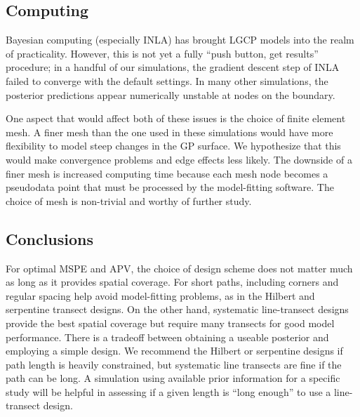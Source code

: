 \documentclass[review]{elsarticle}
\begin{document}


\subsection{Computing}

Bayesian computing (especially INLA) has brought LGCP models into the realm of
practicality. However, this is not yet a fully ``push button, get results''
procedure; in a handful of our simulations, the gradient descent step of INLA
failed to converge with the default settings. In many other simulations, the
posterior predictions appear numerically unstable at nodes on the boundary.

One aspect that would affect both of these issues is the choice of finite
element mesh. A finer mesh than the one used in these simulations would have
more flexibility to model steep changes in the GP surface. We hypothesize that
this would make convergence problems and edge effects less likely. The downside
of a finer mesh is increased computing time because each mesh node becomes a
pseudodata point that must be processed by the model-fitting software. The
choice of mesh is non-trivial and worthy of further study.


\subsection{Conclusions}

For optimal MSPE and APV, the choice of design scheme does not matter much as
long as it provides spatial coverage. For short paths, including corners and
regular spacing help avoid model-fitting problems, as in the Hilbert and
serpentine transect designs. On the other hand, systematic line-transect
designs provide the best spatial coverage but require many transects for good
model performance. There is a tradeoff between obtaining a useable posterior
and employing a simple design. We recommend the Hilbert or serpentine designs
if path length is heavily constrained, but systematic line transects are fine
if the path can be long. A simulation using available prior information for a
specific study will be helpful in assessing if a given length is ``long
enough'' to use a line-transect design.
\end{document}
